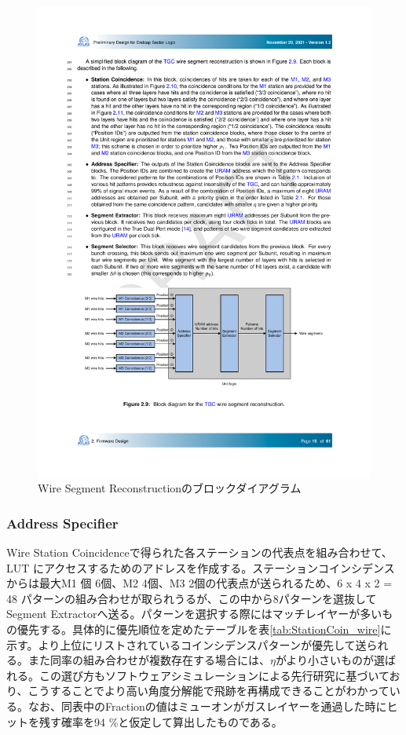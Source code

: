 \begin{figure} 
\centering
\includegraphics[width=16cm]{fig/SL/SegReco_wire.pdf}
\caption[Wire Segment Reconstructionのブロックダイアグラム]{Wire Segment Reconstructionのブロックダイアグラム\cite{SLPDR}}
\label{SegReco_wire}
\end{figure}

\subsubsection*{Address Specifier}
Wire Station Coincidenceで得られた各ステーションの代表点を組み合わせて、LUT にアクセスするためのアドレスを作成する。ステーションコインシデンスからは最大M1 個 6個、M2 4個、M3 2個の代表点が送られるため、6 x 4 x 2 = 48 パターンの組み合わせが取られうるが、この中から8パターンを選抜してSegment Extractorへ送る。パターンを選択する際にはマッチレイヤーが多いもの優先する。具体的に優先順位を定めたテーブルを表\ref{tab:StationCoin_wire}に示す。より上位にリストされているコインシデンスパターンが優先して送られる。また同率の組み合わせが複数存在する場合には、$\eta$がより小さいものが選ばれる。この選び方もソフトウェアシミュレーションによる先行研究に基づいており、こうすることでより高い角度分解能で飛跡を再構成できることがわかっている。なお、同表中のFractionの値はミューオンがガスレイヤーを通過した時にヒットを残す確率を94 \%と仮定して算出したものである。

